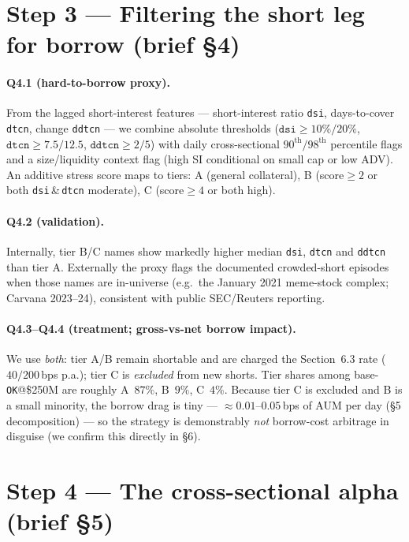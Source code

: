 \documentclass[11pt,a4paper]{article}
\newcommand{\code}[1]{\texttt{#1}}
\begin{document}
\section{Step 3 --- Filtering the short leg for borrow (brief §4)}

\paragraph{Q4.1 (hard-to-borrow proxy).} From the lagged short-interest features --- short-interest ratio
\code{dsi}, days-to-cover \code{dtcn}, change \code{ddtcn} --- we combine absolute thresholds
($\code{dsi}\ge10\%/20\%$, $\code{dtcn}\ge7.5/12.5$, $\code{ddtcn}\ge2/5$) with daily cross-sectional
$90^{\text{th}}/98^{\text{th}}$ percentile flags and a size/liquidity context flag (high SI conditional on
small cap or low ADV). An additive stress score maps to tiers: A (general collateral), B (score$\ge2$ or both
\code{dsi}\,\&\,\code{dtcn} moderate), C (score$\ge4$ or both high).

\paragraph{Q4.2 (validation).} Internally, tier B/C names show markedly higher median \code{dsi}, \code{dtcn}
and \code{ddtcn} than tier A. Externally the proxy flags the documented crowded-short episodes when those
names are in-universe (e.g.\ the January 2021 meme-stock complex; Carvana 2023--24), consistent with public
SEC/Reuters reporting.

\paragraph{Q4.3--Q4.4 (treatment; gross-vs-net borrow impact).} We use \emph{both}: tier A/B remain shortable
and are charged the Section~6.3 rate ($40/200$\,bps p.a.); tier C is \emph{excluded} from new shorts. Tier
shares among base-\code{OK}@\$250M are roughly A~$87\%$, B~$9\%$, C~$4\%$. Because tier C is excluded and B is a
small minority, the borrow drag is tiny --- $\approx0.01$--$0.05$\,bps of AUM per day (\S5 decomposition) ---
so the strategy is demonstrably \emph{not} borrow-cost arbitrage in disguise (we confirm this directly in
\S6).

\section{Step 4 --- The cross-sectional alpha (brief §5)}
\end{document}

